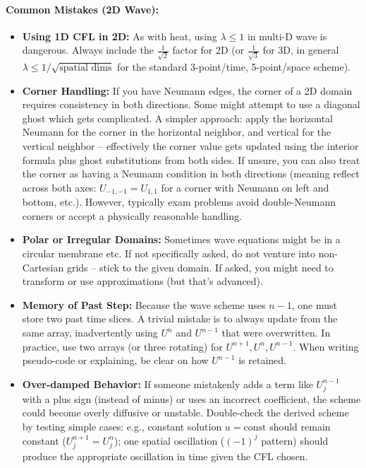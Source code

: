 \documentclass[a4paper,11pt]{report}
\begin{document}
\paragraph{Common Mistakes (2D Wave):}
\begin{itemize}
    \item \textbf{Using 1D CFL in 2D:} As with heat, using $\lambda \le 1$ in multi-D wave is dangerous. Always include the $\frac{1}{\sqrt{2}}$ factor for 2D (or $\frac{1}{\sqrt{3}}$ for 3D, in general $\lambda \le 1/\sqrt{\text{spatial dims}}$ for the standard 3-point/time, 5-point/space scheme).

    \item \textbf{Corner Handling:} If you have Neumann edges, the corner of a 2D domain requires consistency in both directions. Some might attempt to use a diagonal ghost which gets complicated. A simpler approach: apply the horizontal Neumann for the corner in the horizontal neighbor, and vertical for the vertical neighbor -- effectively the corner value gets updated using the interior formula plus ghost substitutions from both sides. If unsure, you can also treat the corner as having a Neumann condition in both directions (meaning reflect across both axes: $U_{-1,-1} = U_{1,1}$ for a corner with Neumann on left and bottom, etc.). However, typically exam problems avoid double-Neumann corners or accept a physically reasonable handling.

    \item \textbf{Polar or Irregular Domains:} Sometimes wave equations might be in a circular membrane etc. If not specifically asked, do not venture into non-Cartesian grids -- stick to the given domain. If asked, you might need to transform or use approximations (but that's advanced).

    \item \textbf{Memory of Past Step:} Because the wave scheme uses $n-1$, one must store two past time slices. A trivial mistake is to always update from the same array, inadvertently using $U^{n}$ and $U^{n-1}$ that were overwritten. In practice, use two arrays (or three rotating) for $U^{n+1},U^n,U^{n-1}$. When writing pseudo-code or explaining, be clear on how $U^{n-1}$ is retained.

    \item \textbf{Over-damped Behavior:} If someone mistakenly adds a term like $U_j^{n-1}$ with a plus sign (instead of minus) or uses an incorrect coefficient, the scheme could become overly diffusive or unstable. Double-check the derived scheme by testing simple cases: e.g., constant solution $u=\text{const}$ should remain constant ($U_j^{n+1}=U_j^n$); one spatial oscillation ($(-1)^j$ pattern) should produce the appropriate oscillation in time given the CFL chosen.
\end{itemize}
\end{document}
